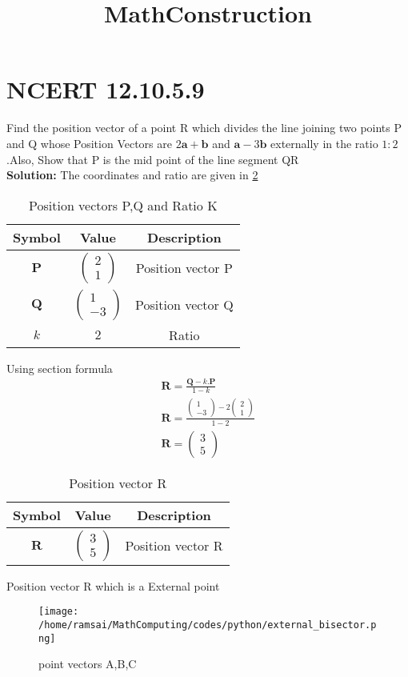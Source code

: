 \documentclass{article}
\title{MathConstruction}
\newcommand{\myvec}[1]{\ensuremath{\begin{pmatrix}#1\end{pmatrix}}}
\let\vec\mathbf
\begin{document}
\section{NCERT 12.10.5.9}

Find the position vector of a point R which divides the line joining two points P and Q whose Position Vectors are $2\vec{a}+\vec{b}$ and $\vec{a}-3\vec{b}$ externally in the ratio $1:2$.Also, Show that P is the mid point of the line segment QR  \\
\textbf{Solution:}
The coordinates and ratio are given in \ref{tab:mytable}
\begin{table}[h]
    \centering
    \begin{tabular}{|c|c|c|}
        \hline
	\textbf{Symbol} & \textbf{Value} & \textbf{Description}\\
        \hline
	$\vec{P}$ & $\myvec{2\\1}$ & Position vector P\\
        \hline
	$\vec{Q}$ & $\myvec{1\\-3}$ & Position vector Q\\
        \hline
	$k$ & $2$ & Ratio\\
        \hline
    \end{tabular}
    \label{tab:mytable}
    \caption{Position vectors P,Q and Ratio K}
\end{table}

Using section formula
\begin{align}
    \vec{R}=\frac{\vec{Q}-k.\vec{P}}{1-k}\\
    \vec{R}=\frac{\myvec{1\\-3}-2\myvec{2\\1}}{1-2}\\
    \vec{R}=\myvec{3\\5}
\end{align}
\begin{table}[h]
    \centering
    \begin{tabular}{|c|c|c|}
        \hline
	\textbf{Symbol} & \textbf{Value} & \textbf{Description} \\
        \hline
	$\vec{R}$ & $\myvec{3\\5}$  & Position vector R\\
        \hline
    \end{tabular}
    \label{tab:mytable}
    \caption{Position vector R}
\end{table}
Position vector R which is a External point
\begin{figure}[!ht]
    \centering
    \texttt{[image: /home/ramsai/MathComputing/codes/python/external\_bisector.png]}
    \caption{point vectors A,B,C}
    \label{fig:enter-label}
\end{figure}
\end{document}
